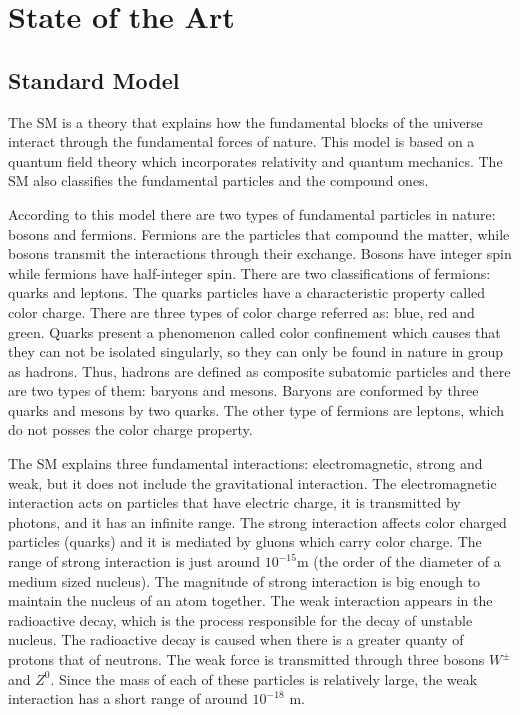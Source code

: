 \chapter{State of the Art} 

\section{Standard Model}


The SM is a theory that explains how the fundamental blocks of the universe interact through the fundamental forces of nature. This model is based on a quantum field theory which incorporates relativity and quantum mechanics. The SM also classifies the fundamental particles and the compound ones. 

According to this model there are two types of fundamental particles in nature: bosons and fermions. Fermions are the particles that compound the matter, while bosons transmit the interactions through their exchange. Bosons have integer spin while fermions have half-integer spin. There are two classifications of fermions: quarks and leptons. The quarks particles have a characteristic property called color charge. There are three types of color charge referred as: blue, red and green. Quarks present a phenomenon called color confinement which causes that they can not be isolated singularly, so they can only be found in nature in group as hadrons. Thus, hadrons are defined as composite subatomic particles and there are two types of them: baryons and mesons. Baryons are conformed by three quarks and mesons by two quarks. The other type of fermions are leptons, which do not posses the color charge property.

The SM explains three fundamental interactions: electromagnetic, strong and weak, but it does not include the gravitational interaction. The electromagnetic interaction acts on particles that have electric charge, it is transmitted by photons, and it has an infinite range. The strong interaction affects color charged particles (quarks) and it is mediated by gluons which carry color charge. The range of strong interaction is just around $10^{-15}$m (the order of the diameter of a medium sized nucleus). The magnitude of strong interaction is big enough to maintain the nucleus of an atom together. The weak interaction appears in the radioactive decay, which is the process responsible for the decay of unstable nucleus. The radioactive decay is caused when there is a greater quanty of protons that of neutrons. The weak force is transmitted through three bosons $W^{\pm}$ and $Z^0$. Since the mass of each of these particles is relatively large, the weak interaction has a short range of around $10^{-18}$ m. 


